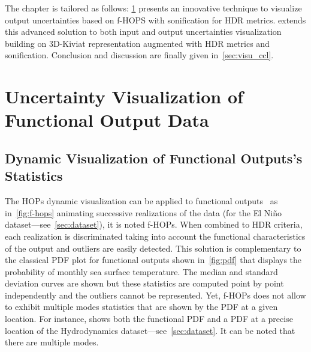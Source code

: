 The chapter is tailored as follows: \cref{sec:uqvisu} presents an innovative technique to visualize output uncertainties based on f-HOPS with sonification for HDR metrics.  extends this advanced solution to both input and output uncertainties visualization building on 3D-Kiviat representation augmented with HDR metrics and sonification. Conclusion and discussion are finally given in~\cref{sec:visu_ccl}.


\section{Uncertainty Visualization of Functional Output Data}
\label{sec:uqvisu}

\subsection{Dynamic Visualization of Functional Outputs's Statistics}
\label{subsec:fhop}

%


The HOPs dynamic visualization can be applied to functional outputs~\citep{Kale2018} as in~\cref{fig:f-hops} animating successive realizations of the data (for the El Ni\~no dataset---see~\cref{sec:dataset}), it is noted f-HOPs. When combined to HDR criteria, each realization is discriminated taking into account the functional characteristics of the output and outliers are easily detected. This solution is complementary to the classical PDF plot for functional outputs shown in~\cref{fig:pdf} that displays the probability of monthly sea surface temperature. The median and standard deviation curves are shown but these statistics are computed point by point independently and the outliers cannot be represented. Yet, f-HOPs does not allow to exhibit multiple modes statistics that are shown by the PDF at a given location. For instance,  shows both the functional PDF and a PDF at a precise location of the Hydrodynamics dataset---see~\cref{sec:dataset}. It can be noted that there are multiple modes.


